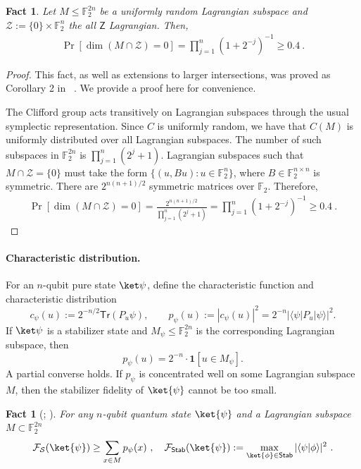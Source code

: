 \documentclass[11pt]{article}
\newtheorem{fact}[theorem]{Fact}
\newcommand{\FF}{\mathbb{F}}
\newcommand{\calF}{{\cal F }}
\newcommand{\calS}{{\cal S }}
\newcommand{\braketbra}[3]{\langle #1|#2| #3 \rangle}
\newcommand{\Sh}{\ensuremath{\textsf{Stab}}}
\newcommand{\Z}{\mathsf{Z}}
\newcommand{\Tr}{\mathsf{Tr}}
\newcommand{\F}{\mathbb{F}}
\begin{document}
\begin{fact}\label{fact:random_lagrangian}
    Let $M \leq \F_2^{2n}$ be a uniformly random Lagrangian subspace and $\mathcal{Z}:= \{0\}\times \F_2^n$ the all $\Z$ Lagrangian. Then,
    \begin{align}
        \Pr[\dim(M \cap \mathcal{Z}) = 0] = \prod_{j=1}^n (1+2^{-j})^{-1} \geq 0.4\ .
    \end{align}
\end{fact}
\begin{proof}
    This fact, as well as extensions to larger intersections, was proved as Corollary 2 in ~\cite{kueng2015qubit}. We provide a proof here for convenience. 

    The Clifford group acts transitively on Lagrangian subspaces through the usual symplectic representation. Since $C$ is uniformly random, we have that $C(M)$ is uniformly distributed over all Lagrangian subspaces. The number of such subspaces in $\F_2^{2n}$ is $\prod_{j=1}^n(2^j+1)$. Lagrangian subspaces such that $M\cap \mathcal{Z} = \{0\}$ must take the form $\{(u,Bu): u \in \F_2^{n}\}$, where $B\in \F_2^{n \times n}$ is symmetric. There are $2^{n(n+1)/2}$ symmetric matrices over $\F_2$. Therefore,
    \begin{align}
        \Pr[\dim(M \cap \mathcal{Z}) = 0] = \frac{2^{n(n+1)/2}}{\prod_{j=1}^n (2^j+1)} =  \prod_{j=1}^n (1+2^{-j})^{-1} \geq 0.4\ .
    \end{align}
\end{proof}

\paragraph{Characteristic distribution.} For an $n$-qubit pure state $\ket\psi$, define the characteristic function and
characteristic distribution
$$
    c_\psi(u):=2^{-n/2}\Tr(P_u\psi),
    \qquad
    p_\psi(u):=|c_\psi(u)|^2=2^{-n}|\braketbra{\psi}{P_u}{\psi}|^2.
$$
If $\ket\psi$ is a stabilizer state and $M_\psi\le\F_2^{2n}$ is the corresponding Lagrangian subspace, then
$$
    p_\psi(u)=2^{-n}\cdot \mathbf 1[u\in M_\psi].
$$
A partial converse holds. If $p_\psi$ is concentrated well on some Lagrangian subspace $M$, then the stabilizer fidelity of $\ket{\psi}$ cannot be too small.
\begin{fact}[{\cite[Theorem 3.3]{gross2021schur}}; {\cite[Corollary 7.4]{grewal2024improved}}]
\label{fact:lower_bound_stabilizer_fidelity_pPsi_lagrangian_subspace}
For any $n$-qubit quantum state $\ket{\psi}$ and a Lagrangian subspace $M \subset \FF_2^{2n}$
\begin{equation*}
    \calF_\calS(\ket{\psi}) \geq \sum_{x \in M} p_\psi(x)\ , \quad \mathcal{F}_{\cal \Sh}(\ket{\psi}):=\max_{\ket{\phi}\in \Sh}|\langle \psi|\phi\rangle|^2 \ .
\end{equation*}
\end{fact}
\end{document}
